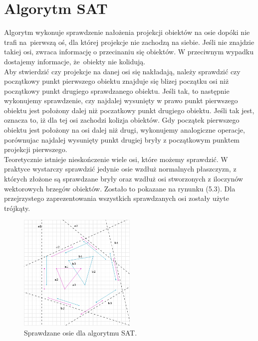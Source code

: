 \section{Algorytm SAT}
Algorytm wykonuje sprawdzenie nałożenia projekcji obiektów na osie dopóki nie trafi na~pierwszą oś, dla której projekcje nie zachodzą na siebie. Jeśli nie znajdzie takiej osi, zwraca informację o przecinaniu się obiektów. W przeciwnym wypadku dostajemy informacje, że~obiekty nie kolidują. \\
Aby stwierdzić czy projekcje na danej osi się nakładają, należy sprawdzić czy początkowy punkt pierwszego obiektu znajduje się blizej początku osi niż początkowy punkt drugiego sprawdzanego obiektu. Jeśli tak, to następnie wykonujemy sprawdzenie, czy najdalej wysunięty w prawo punkt pierwszego obiektu jest położony dalej niż poczatkowy punkt drugiego obiektu. Jeśli tak jest, oznacza to, iż dla tej osi zachodzi kolizja obiektów. Gdy początek pierwszego obiektu jest położony na osi dalej niż drugi, wykonujemy analogiczne operacje, porównujac najdalej wysunięty punkt drugiej bryły z początkowym punktem projekcji pierwszego. \\
Teoretycznie istnieje nieskończenie wiele osi, które możemy sprawdzić. W praktyce wystarczy sprawdzić jedynie osie wzdłuż normalnych płaszczyzn, z których złożone są sprawdzane bryły oraz wzdłuż osi stworzonych z iloczynów wektorowych brzegów obiektów. Zostało to pokazane na rynunku (5.3). Dla przejrzystego zaprezentowania wszystkich sprawdzanych osi zostały użyte trójkąty.
\begin{figure}[h]
\centering
\includegraphics[width=0.5\textwidth]{figures/sat_test.png}
\caption{Sprawdzane osie dla algorytmu SAT\protect\cite{sat_help}.}%
\label{rys:Sprawdzane osie dla algorytmu SAT}
\end{figure}

